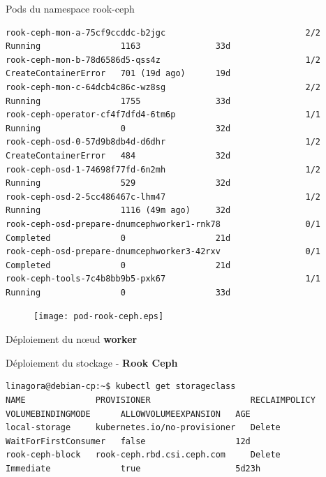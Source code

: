\begin{frame}[fragile,shrink=0.9]{Pods du namespace rook-ceph}
\begin{tiny}
\begin{Verbatim}[commandchars=\\\{\}]
rook-ceph-mon-a-75cf9ccddc-b2jgc                            2/2     Running                1163               33d
rook-ceph-mon-b-78d6586d5-qss4z                             1/2     CreateContainerError   701 (19d ago)      19d
rook-ceph-mon-c-64dcb4c86c-wz8sg                            2/2     Running                1755               33d
rook-ceph-operator-cf4f7dfd4-6tm6p                          1/1     Running                0                  32d
rook-ceph-osd-0-57d9b8db4d-d6dhr                            1/2     CreateContainerError   484                32d
rook-ceph-osd-1-74698f77fd-6n2mh                            1/2     Running                529                32d
rook-ceph-osd-2-5cc486467c-lhm47                            1/2     Running                1116 (49m ago)     32d
rook-ceph-osd-prepare-dnumcephworker1-rnk78                 0/1     Completed              0                  21d
rook-ceph-osd-prepare-dnumcephworker3-42rxv                 0/1     Completed              0                  21d
rook-ceph-tools-7c4b8bb9b5-pxk67                            1/1     Running                0                  33d
\end{Verbatim}
\end{tiny}

\begin{figure}
\begin{center}
\texttt{[image: pod-rook-ceph.eps]}
\end{center}
\end{figure}

\end{frame}


\begin{frame}[fragile]{Déploiement du n{\oe}ud \textbf{worker}}



\end{frame}


\begin{frame}[fragile]{Déploiement du stockage - \textbf{Rook Ceph}}

\begin{tiny}
\begin{Verbatim}[commandchars=\\\{\}]
linagora@debian-cp:~$ kubectl get storageclass
NAME              PROVISIONER                    RECLAIMPOLICY   VOLUMEBINDINGMODE      ALLOWVOLUMEEXPANSION   AGE
local-storage     kubernetes.io/no-provisioner   Delete          WaitForFirstConsumer   false                  12d
rook-ceph-block   rook-ceph.rbd.csi.ceph.com     Delete          Immediate              true                   5d23h
\end{Verbatim}
\end{tiny}

\end{frame}

